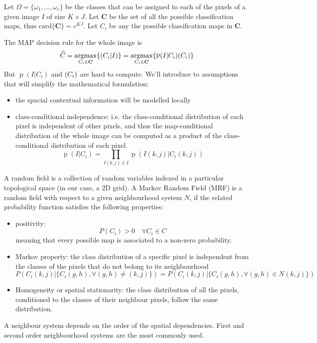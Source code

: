 \documentclass[oneside,onecolumn]{report}
\DeclareMathOperator*{\argmax}{argmax}
\DeclareMathOperator*{\pdf}{p}
\let\P\relax
\DeclareMathOperator*{\P}{P}
\begin{document}
Let $\Omega = \{\omega_1, \dots, \omega_c\}$ be the classes that can be assigned to each of the pixels of a given image $I$ of size $K \times J$.
Let $\bm C$ be the set of all the possible classification maps, thus $\text{card}\{\bm C\} = c^{K J}$.
Let $C_i$ be any the possible classification maps in $\bm C$.

The MAP decision rule for the whole image is
$$ \widehat C = \argmax_{C_i \in \bm C}\{\P(C_i | I)\} = \argmax_{C_i \in \bm C}\{\pdf(I | C_i) \P(C_i) \} $$
But $\pdf(I | C_i)$ and $\P(C_i)$ are hard to compute.
We'll introduce to assumptions that will simplify the mathematical formulation:
\begin{itemize}
    \item the spacial contextual information will be modelled locally
    \item class-conditional independence: i.e. the class-conditional distribution of each pixel is independent of other pixels, and thus the map-conditional distribution of the whole image can be computed as a product of the class-conditional distribution of each pixel.
    $$ \pdf(I | C_i) = \prod_{I(k, j) \in I} \pdf(I(k, j) | C_i(k, j)) $$
\end{itemize}

A random field is a collection of random variables indexed in a particular topological space (in our case, a 2D grid).
A Markov Random Field (MRF) is a random field with respect to a given neighbourhood system $N$, if the related probability function satisfies the following properties:
\begin{itemize}
    \item positivity:
    $$ P(C_i) > 0 \quad \forall C_i \in C $$
    meaning that every possible map is associated to a non-zero probability.

    \item Markov property: the class distribution of a specific pixel is independent from the classes of the pixels that do not belong to its neighbourhood
    $$ P(C_i(k, j) | \{ C_i(g, h), \forall (g, h) \neq (k, j) \}) =
    P(C_i(k, j) | \{ C_i(g, h), \forall (g, h) \in N(k, j) \}) $$

    \item Homogeneity or spatial stationarity: the class distribution of all the pixels, conditioned to the classes of their neighbour pixels, follow the same distribution.
\end{itemize}

A neighbour system depends on the order of the spatial dependencies.
First and second order neighbourhood systems are the most commonly used.
\end{document}
